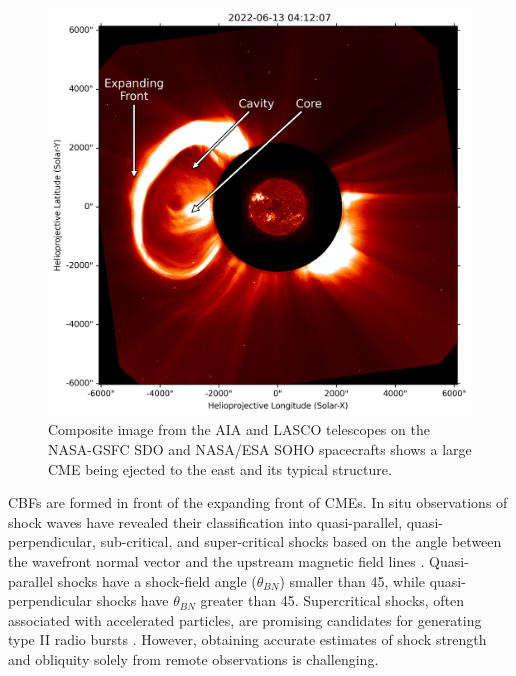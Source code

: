 \begin{figure}[!htp]
	\centerline{\includegraphics[width=0.8\columnwidth]{chapter1/figs/AIA_LASCO_composite_2022613.png}}
	\caption{Composite image from the AIA and LASCO telescopes on the NASA-GSFC SDO and NASA/ESA SOHO spacecrafts shows a large CME being ejected to the east and its typical structure.}
	\label{fig_cme}
\end{figure}

CBFs are formed in front of the expanding front of CMEs. In situ observations of shock waves have revealed their classification into quasi-parallel, quasi-perpendicular, sub-critical, and super-critical shocks based on the angle between the wavefront normal vector and the upstream magnetic field lines \citep{tsurutani_1985}. Quasi-parallel shocks have a shock-field angle ($\theta_{BN}$) smaller than 45\degree, while quasi-perpendicular shocks have $\theta_{BN}$ greater than 45\degree. Supercritical shocks, often associated with accelerated particles, are promising candidates for generating type II radio bursts \citep{benz_1988}. However, obtaining accurate estimates of shock strength and obliquity solely from remote observations is challenging.

